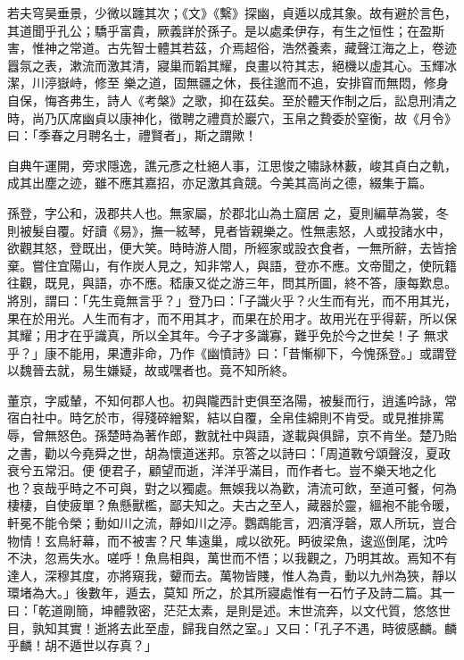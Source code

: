 
\begin{pinyinscope}

 若夫穹昊垂景，少微以躔其次；《文》《繫》探幽，貞遁以成其象。故有避於言色，其道聞乎孔公；驕乎富貴，厥義詳於孫子。是以處柔伊存，有生之恒性；在盈斯害，惟神之常道。古先智士體其若茲，介焉超俗，浩然養素，藏聲江海之上，卷迹囂氛之表，漱流而激其清，寢巢而韜其耀，良畫以符其志，絕機以虛其心。玉輝冰潔，川渟嶽峙，修至
 樂之道，固無疆之休，長往邈而不追，安排窅而無悶，修身自保，悔吝弗生，詩人《考槃》之歌，抑在茲矣。至於體天作制之后，訟息刑清之時，尚乃仄席幽貞以康神化，徵聘之禮賁於巖穴，玉帛之贄委於窒衡，故《月令》曰：「季春之月聘名士，禮賢者」，斯之謂歟！



 自典午運開，旁求隱逸，譙元彥之杜絕人事，江思悛之嘯詠林藪，峻其貞白之軌，成其出塵之迹，雖不應其嘉招，亦足激其貪競。今美其高尚之德，綴集于篇。



 孫登，字公和，汲郡共人也。無家屬，於郡北山為土窟居
 之，夏則編草為裳，冬則被髮自覆。好讀《易》，撫一絃琴，見者皆親樂之。性無恚怒，人或投諸水中，欲觀其怒，登既出，便大笑。時時游人間，所經家或設衣食者，一無所辭，去皆捨棄。嘗住宜陽山，有作炭人見之，知非常人，與語，登亦不應。文帝聞之，使阮籍往觀，既見，與語，亦不應。嵇康又從之游三年，問其所圖，終不答，康每歎息。將別，謂曰：「先生竟無言乎？」登乃曰：「子識火乎？火生而有光，而不用其光，果在於用光。人生而有才，而不用其才，而果在於用才。故用光在乎得薪，所以保其耀；用才在乎識真，所以全其年。今子才多識寡，難乎免於今之世矣！子
 無求乎？」康不能用，果遭非命，乃作《幽憤詩》曰：「昔慚柳下，今愧孫登。」或謂登以魏晉去就，易生嫌疑，故或嘿者也。竟不知所終。



 董京，字威輦，不知何郡人也。初與隴西計吏俱至洛陽，被髮而行，逍遙吟詠，常宿白社中。時乞於市，得殘碎繒絮，結以自覆，全帛佳綿則不肯受。或見推排罵辱，曾無怒色。孫楚時為著作郎，數就社中與語，遂載與俱歸，京不肯坐。楚乃貽之書，勸以今堯舜之世，胡為懷道迷邦。京答之以詩曰：「周道斁兮頌聲沒，夏政衰兮五常汨。便
 便君子，顧望而逝，洋洋乎滿目，而作者七。豈不樂天地之化也？哀哉乎時之不可與，對之以獨處。無娛我以為歡，清流可飲，至道可餐，何為棲棲，自使疲單？魚懸獸檻，鄙夫知之。夫古之至人，藏器於靈，縕袍不能令暖，軒冕不能令榮；動如川之流，靜如川之渟。鸚鵡能言，泗濱浮磬，眾人所玩，豈合物情！玄鳥紆幕，而不被害？尺隼遠巢，咸以欲死。眄彼梁魚，逡巡倒尾，沈吟不決，忽焉失水。嗟呼！魚鳥相與，萬世而不悟；以我觀之，乃明其故。焉知不有達人，深穆其度，亦將窺我，顰而去。萬物皆賤，惟人為貴，動以九州為狹，靜以環堵為大。」後數年，遁去，莫知
 所之，於其所寢處惟有一石竹子及詩二篇。其一曰：「乾道剛簡，坤體敦密，茫茫太素，是則是述。末世流奔，以文代質，悠悠世目，孰知其實！逝將去此至虛，歸我自然之室。」又曰：「孔子不遇，時彼感麟。麟乎麟！胡不遁世以存真？」




\end{pinyinscope}
